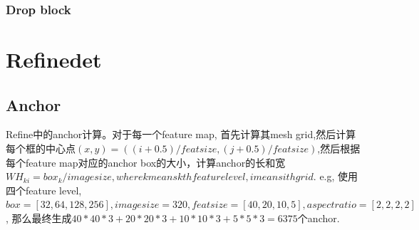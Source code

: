 \documentclass{article}
\begin{document}
\subsubsection{Drop block}

\section{Refinedet}
\subsection{Anchor}
Refine中的anchor计算。对于每一个feature map, 首先计算其mesh grid,然后计算每个框的中心点$(x,y)=((i+0.5)/featsize,(j+0.5)/featsize)$,然后根据每个feature map对应的anchor box的大小，计算anchor的长和宽$WH_{ki}=box_k/imagesize, where k means kth feature level, i means ith grid$. e.g, 使用四个feature level, $box=[32,64,128,256], imagesize=320, featsize=[40,20,10,5], aspect ratio=[2,2,2,2]$, 那么最终生成$40*40*3+20*20*3+10*10*3+5*5*3=6375$个anchor.
\end{document}
